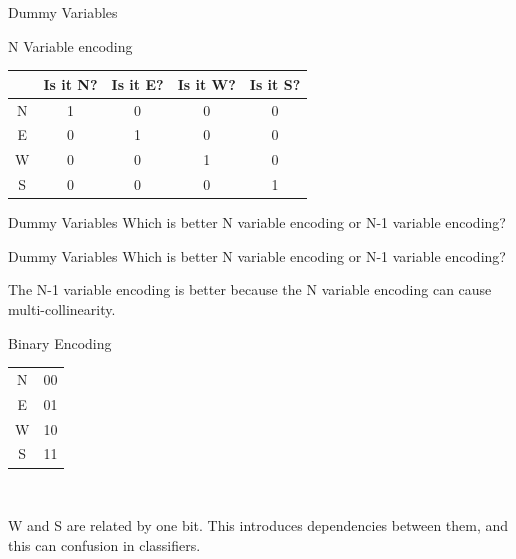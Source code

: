 \documentclass{beamer}
\begin{document}
\begin{frame}{Dummy Variables}
    \begin{center}
    
        N Variable encoding\\
        \vspace{1em}
        \begin{tabular}{|c|c|c|c|c|}
        \hline
        & Is it N? &Is it E? &Is it W? & Is it S?\\
        \hline
        \hline
            N & 1&0&0&0 \\
            E & 0&1&0&0\\
            W & 0&0&1&0\\
            S & 0&0&0&1\\
        \hline
        \end{tabular}
    \end{center}
\end{frame}

\begin{frame}{Dummy Variables}
    Which is better N variable encoding or N-1 variable encoding?
\end{frame}

\begin{frame}{Dummy Variables}
    Which is better N variable encoding or N-1 variable encoding?
    
    The N-1 variable encoding is better because the N variable encoding can cause multi-collinearity.
\end{frame}


\begin{frame}{Binary Encoding}

\begin{center}
    \begin{tabular}{|c|c|}
        \hline
         N & 00 \\
         E& 01\\
         W & 10\\
         S& 11\\
         \hline
    \end{tabular}\\
\end{center}
    
    
    \vspace{1em}
    W and S are related by one bit. This introduces dependencies between them, and this can confusion in classifiers.
\end{frame}
\end{document}
